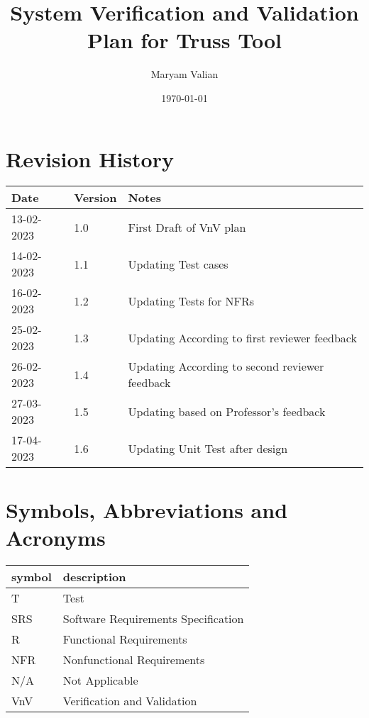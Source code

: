 \documentclass[12pt, titlepage]{article}
\begin{document}
\title{ System Verification and Validation Plan for Truss Tool} 
\author{Maryam Valian}
\date{\today}
	
\maketitle


\section{Revision History}

\begin{tabularx}{\textwidth}{p{3cm}p{2cm}X}
\toprule {\bf Date} & {\bf Version} & {\bf Notes}\\
\midrule
13-02-2023 & 1.0 & First Draft of VnV plan\\
14-02-2023 & 1.1& Updating Test cases   \\
16-02-2023 & 1.2& Updating Tests for NFRs   \\
25-02-2023 & 1.3& Updating According to first reviewer feedback   \\
26-02-2023 & 1.4& Updating According to second reviewer feedback   \\
27-03-2023 & 1.5& Updating based on Professor's feedback \\
17-04-2023 & 1.6& Updating Unit Test after design \\



\bottomrule
\end{tabularx}

\newpage

\tableofcontents

\newpage

\section{Symbols, Abbreviations and Acronyms}

\renewcommand{\arraystretch}{1.2}
\begin{tabular}{l l} 
  \toprule		
  \textbf{symbol} & \textbf{description}\\
  \midrule 
  T & Test\\
  SRS & Software Requirements Specification\\
  R & Functional Requirements\\
  NFR & Nonfunctional Requirements\\
  N/A & Not Applicable\\
  VnV & Verification and Validation\\
  
\bottomrule
\end{tabular}\\
\end{document}

